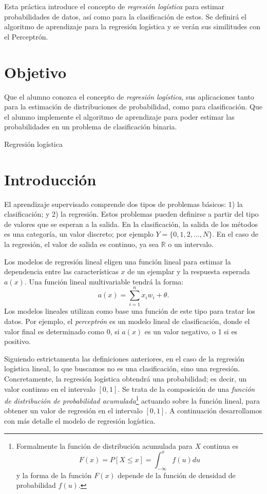 
Esta práctica introduce el concepto de \emph{regresión logística} para estimar probabilidades de datos, así como para la clasificación de estos. Se definirá el algoritmo de aprendizaje para la regresión logística y se verán sus similitudes con el Perceptrón.


\section{Objetivo}

Que el alumno conozca el concepto de \textit{regresión logística}, sus aplicaciones tanto para la estimación de distribuciones de probabilidad, como para clasificación. Que el alumno implemente el algoritmo de aprendizaje para poder estimar las probabilidades en un problema de clasificación binaria.

\begin{auxcode}
 \caption{Regresión logística}
 \centering
\end{auxcode}


\section{Introducción}

El aprendizaje supervisado comprende dos tipos de problemas básicos: 1) la clasificación; y 2) la regresión. Estos problemas pueden definirse a partir del tipo de valores que se esperan a la salida. En la clasificación, la salida de los métodos es una categoría, un valor discreto; por ejemplo $Y = \{0,1,2,...,N\}$. En el caso de la regresión, el valor de salida es continuo, ya sea $\mathbb{R}$ o un intervalo.

Los modelos de regresión lineal eligen una función lineal para estimar la dependencia entre las características $x$ de un ejemplar y la respuesta esperada $a(x)$. Una función lineal multivariable tendrá la forma: $$a(x) = \sum_{i=1}^n x_iw_i + \theta.$$
Los modelos lineales utilizan como base una función de este tipo para tratar los datos. Por ejemplo, el \textit{perceptrón} es un modelo lineal de clasificación, donde el valor final es determinado como 0, si $a(x)$ es un valor negativo, o 1 si es positivo.

Siguiendo estrictamenta las definiciones anteriores, en el caso de la regresión logística lineal, lo que buscamos no es una clasificación, sino una regresión. Concretamente, la regresión logística obtendrá una probabilidad; es decir, un valor continuo en el intervalo $[0,1]$.  Se trata de la composición de una \emph{función de distribución de probabilidad acumulada}\footnote{Formalmente la función de distribución acumulada para $X$ continua es $$F(x) = P[X \leq x] =\int_{-\infty}^{x} f(u) du$$ y la forma de la función $F(x)$ depende de la función de densidad de probabilidad $f(u)$.} actuando sobre la función lineal, para obtener un valor de regresión en el intervalo $[0,1]$. A continuación desarrollamos con más detalle el modelo de regresión logística.


